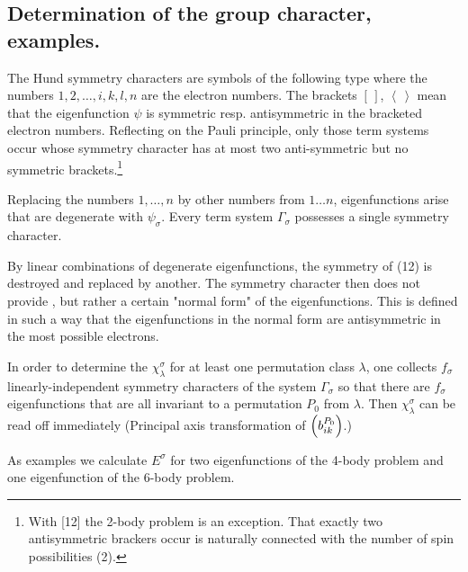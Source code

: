\begin{paper}{1}
\section{Determination of the group character, examples.} The Hund symmetry characters are symbols of the following type
where the numbers $1,2,\dots,i,k,l,n$ are the electron numbers. The brackets $\left[\,\right]$, $\left<\,\right>$ mean that the eigenfunction $\psi$ is symmetric resp. antisymmetric in the bracketed electron numbers. Reflecting on the Pauli principle, only those term systems occur whose symmetry character has at most two anti-symmetric but no symmetric brackets.\footnote{With [12] the 2-body problem is an exception. That exactly two antisymmetric brackers occur is naturally connected with the number of spin possibilities (2).}

Replacing the numbers $1,\dots,n$ by other numbers from $1\dots n$, eigenfunctions arise that are degenerate with $\psi_\sigma$. Every term system $\Gamma_\sigma$ possesses a single symmetry character.

By linear combinations of degenerate eigenfunctions, the symmetry of (12) is destroyed and replaced by another. The symmetry character then does not provide , but rather a certain "normal form" of the eigenfunctions. This is defined in such a way that the eigenfunctions in the normal form are antisymmetric in the most possible electrons.

In order to determine the $\chi_\lambda^\sigma$ for at least one permutation class $\lambda$, one collects $f_\sigma$ linearly-independent symmetry characters of the system $\Gamma_\sigma$ so that there are $f_\sigma$ eigenfunctions that are all invariant to a permutation $P_0$ from $\lambda$. Then $\chi_\lambda^\sigma$ can be read off immediately (Principal axis transformation of $\Aikp{b}{ik}{P_0}$.)

As examples we calculate $E^\sigma$ for two eigenfunctions of the 4-body problem and one eigenfunction of the 6-body problem.


\end{paper}
